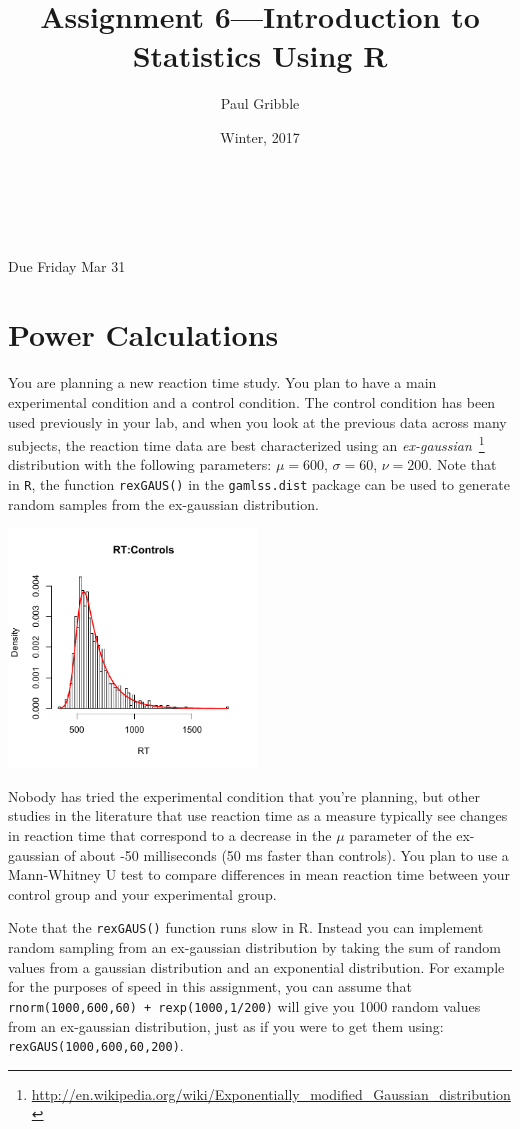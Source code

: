 \documentclass[10pt]{article}
\title{Assignment 6---Introduction to Statistics Using R}
\author{Paul Gribble}
\date{Winter, 2017}
\makeatletter
\renewcommand{\maketitle}{
\begin{flushleft}          %
{\Large\sffamily\bfseries\@title}   %
\vspace{3ex}\\            %
{\normalsize\sffamily\@author}           %
\vspace{0ex}\\             %
\normalsize\sffamily\@date                     %
\vspace{5ex}              %
\end{flushleft}
}
\makeatother
\begin{document}
\maketitle

\thispagestyle{empty}

{\flushleft \sffamily * Due Friday Mar 31}

\section*{Power Calculations}

You are planning a new reaction time study. You plan
to have a main experimental condition and a control condition. The
control condition has been used previously in your lab, and when you
look at the previous data across many subjects, the reaction time data
are best characterized using an
\emph{ex-gaussian}~\footnote{\url{http://en.wikipedia.org/wiki/Exponentially_modified_Gaussian_distribution}}
distribution with the following parameters: $\mu=600$, $\sigma=60$,
$\nu=200$. Note that in \texttt{R}, the function \texttt{rexGAUS()} in
the \texttt{gamlss.dist} package can be used to generate random
samples from the ex-gaussian distribution.

\begin{center}
\includegraphics[height=2.5in]{RTexGaus.pdf}
\end{center}

Nobody has tried the experimental condition that you're planning, but
other studies in the literature that use reaction time as a measure
typically see changes in reaction time that correspond to a decrease
in the $\mu$ parameter of the ex-gaussian of about -50 milliseconds
(50 ms faster than controls). You plan to use a Mann-Whitney U test to
compare differences in mean reaction time between your control group
and your experimental group.

Note that the \texttt{rexGAUS()} function runs slow in R. Instead you can implement
random sampling from an ex-gaussian distribution by taking the sum of
random values from a gaussian distribution and an exponential
distribution. For example for the purposes of speed in this
assignment, you can assume that \texttt{rnorm(1000,600,60) +
  rexp(1000,1/200)} will give you 1000 random values from an
ex-gaussian distribution, just as if you were to get them using:
\texttt{rexGAUS(1000,600,60,200)}.
\end{document}
